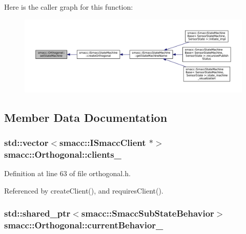 Here is the caller graph for this function\+:
\nopagebreak
\begin{figure}[H]
\begin{center}
\leavevmode
\includegraphics[width=350pt]{classsmacc_1_1Orthogonal_a05f65c01344a6c8593f7f88c0ca19654_icgraph}
\end{center}
\end{figure}




\subsection{Member Data Documentation}
\subsubsection[{\texorpdfstring{clients\+\_\+}{clients_}}]{\setlength{\rightskip}{0pt plus 5cm}std\+::vector$<${\bf smacc\+::\+I\+Smacc\+Client} $\ast$$>$ smacc\+::\+Orthogonal\+::clients\+\_\+\hspace{0.3cm}{\ttfamily [private]}}\hypertarget{classsmacc_1_1Orthogonal_acdcb1b5dca84a6521ef25f07212afa5e}{}\label{classsmacc_1_1Orthogonal_acdcb1b5dca84a6521ef25f07212afa5e}


Definition at line 63 of file orthogonal.\+h.



Referenced by create\+Client(), and requires\+Client().

\subsubsection[{\texorpdfstring{current\+Behavior\+\_\+}{currentBehavior_}}]{\setlength{\rightskip}{0pt plus 5cm}std\+::shared\+\_\+ptr$<${\bf smacc\+::\+Smacc\+Sub\+State\+Behavior}$>$ smacc\+::\+Orthogonal\+::current\+Behavior\+\_\+\hspace{0.3cm}{\ttfamily [private]}}\hypertarget{classsmacc_1_1Orthogonal_a4b393107861122834613734f499ccaeb}{}\label{classsmacc_1_1Orthogonal_a4b393107861122834613734f499ccaeb}


